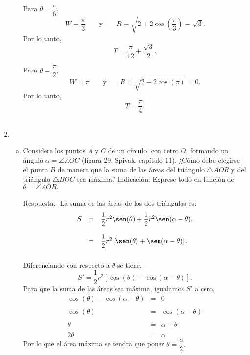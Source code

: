 \begin{enumerate}[\bfseries 1.]
\begin{enumerate}[(i)]
		Para $\theta=\dfrac{\pi}{6},$
		$$W=\dfrac{\pi}{3}\qquad \mbox{y}\qquad R=\sqrt{2+2\cos\left(\dfrac{\pi}{3}\right)}=\sqrt{3}.$$
		Por lo tanto,
		$$T=\dfrac{\pi}{12}+\dfrac{\sqrt{3}}{2}.$$

		Para $\theta=\dfrac{\pi}{2},$
		$$W=\pi \qquad \mbox{y}\qquad R=\sqrt{2+2\cos(\pi)}=0.$$
		Por lo tanto,
		$$T=\dfrac{\pi}{4}.$$\\

	\end{enumerate}


    \item 
	\begin{enumerate}[(a)]

	    \item Considere los puntos $A$ y $C$ de un círculo, con cetro $O$, formando un ángulo $\alpha=\angle AOC$ (figura 29, Spivak, capítulo 11). ¿Cómo debe elegirse el punto $B$ de manera que la suma de las áreas del triángulo $\triangle AOB$ y del triángulo $\triangle BOC$ sea máxima? Indicación: Exprese todo en función de $\theta = \angle AOB.$\\\\
		Respuesta.-\; La suma de las áreas de los dos triángulos es:
		$$\begin{array}{rcl}
		    S&=&\dfrac{1}{2}r^2\sen(\theta) + \dfrac{1}{2}r^2\sen(\alpha-\theta).\\\\
		     &=&\dfrac{1}{2}r^2\left[\sen(\theta)+\sen(\alpha-\theta)\right].\\\\
		\end{array}$$
		Diferenciando con respecto a $\theta$ se tiene,
		$$S'=\dfrac{1}{2}r^2\left[\cos(\theta)-\cos(\alpha-\theta)\right].$$
		Para que la suma de las áreas sea máxima, igualamos $S'$ a cero,
		$$\begin{array}{rcl}
		    \cos(\theta)-\cos(\alpha-\theta)&=&0\\\\
		    \cos(\theta)&=&\cos(\alpha-\theta)\\\\
		    \theta&=&\alpha-\theta\\\\
		    2\theta&=&\alpha
		\end{array}$$
		Por lo que el área máxima se tendra que poner $\theta=\dfrac{\alpha}{2}.$\\\\


\end{enumerate}
\end{enumerate}
